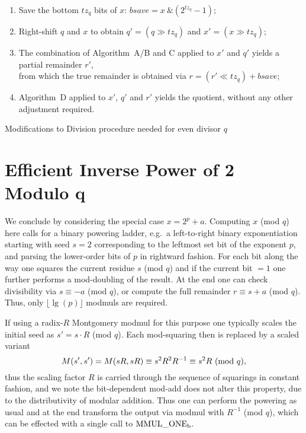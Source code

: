 \documentclass{article}
\begin{document}
\begin{algorithm}[H]
\SetAlgoLined
{}
\begin{enumerate}
\item	Save the bottom $tz_q$ bits of $x$: $bsave = x\ \& (2^{tz_q} - 1)$;
\\
\item	Right-shift $q$ and $x$ to obtain $q' = (q \gg tz_q)$ and $x' = (x \gg tz_q)$;
\\
\item	The combination of Algorithm~A/B and C applied to $x'$ and $q'$ yields a partial remainder $r'$,\\
from which the true remainder is obtained via $r = (r' \ll tz_q) + bsave$;
\\
\item	Algorithm~D applied to $x'$, $q'$ and $r'$ yields the quotient, without any other adjustment required.
\end{enumerate}
\caption{Modifications to Division procedure needed for even divisor $q$}
\end{algorithm}
\vspace{0.1in}



\section{Efficient Inverse Power of 2 Modulo q}
\label{sect:algo_e}

We conclude by considering the special case $x = 2^p + a$. Computing $x$ (mod $q$) here calls for a binary powering ladder, e.g.~a left-to-right binary exponentiation starting with seed $s = 2$ corresponding to the leftmost set bit of the exponent $p$, and parsing the lower-order bits of $p$ in rightward fashion. For each bit along the way one squares the current residue $s$ (mod $q$) and if the current bit $= 1$ one further performs a mod-doubling of the result. At the end one can check divisibility via $s \equiv -a$ (mod $q$), or compute the full remainder $r \equiv s + a$ (mod $q$). Thus, only $\lfloor \lg(p) \rfloor$ modmuls are required.

If using a radix-$R$ Montgomery modmul for this purpose one typically scales the initial seed as $s' = s \cdot R$ (mod $q$). Each mod-squaring then is replaced by a scaled variant
$$
	M(s', s') = M(s R, s R) \equiv s^2 R^2 R^{-1} \equiv s^2 R\ ({\rm mod}\ q) ,
$$
thus the scaling factor $R$ is carried through the sequence of squarings in constant fashion, and we note the bit-dependent mod-add does not alter this property, due to the distributivity of modular addition. Thus one can perform the powering as usual and at the end transform the output via modmul with $R^{-1}$ (mod $q$), which can be effected with a single call to ${\rm MMUL\_ONE_b}$.
\end{document}
